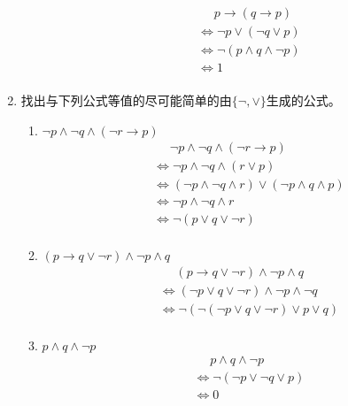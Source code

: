 \documentclass[UTF8]{ctexart}
\begin{document}
\begin{enumerate}
\begin{enumerate}
\[\begin{aligned}
                &\mathrel{\phantom{=}} p\rightarrow(q\rightarrow p)\\
                &\Leftrightarrow \neg p \vee (\neg q \vee p)\\
                &\Leftrightarrow \neg (p \wedge q \wedge \neg p)\\
                &\Leftrightarrow 1\\
            \end{aligned}    
        \]
    \end{enumerate}
    \item 找出与下列公式等值的尽可能简单的由$\{\neg , \vee\}$生成的公式。
    \begin{enumerate}
        \item  $\neg p \wedge  \neg q \wedge  (\neg r \rightarrow  p)$
        \[
            \begin{aligned}
                &\mathrel{\phantom{=}}\neg p \wedge  \neg q \wedge  (\neg r \rightarrow  p)\\
                &\Leftrightarrow \neg p \wedge \neg q \wedge (r \vee p)\\
                &\Leftrightarrow (\neg p \wedge \neg q \wedge r) \vee (\neg p \wedge q \wedge p)\\
                &\Leftrightarrow \neg p \wedge \neg q \wedge r\\
                &\Leftrightarrow \neg (p \vee q \vee \neg r)\\
            \end{aligned}
        \]
        \item  $( p \rightarrow  q \vee  \neg r) \wedge  \neg p \wedge  q$
        \[
            \begin{aligned}
                &\mathrel{\phantom{=}} ( p \rightarrow  q \vee  \neg r) \wedge  \neg p \wedge  q\\
                &\Leftrightarrow (\neg p \vee q \vee \neg r)\wedge \neg p \wedge \neg q\\
                &\Leftrightarrow \neg(\neg(\neg p \vee q \vee \neg r)\vee p \vee q)\\
            \end{aligned}  
        \]
        \item  $p \wedge  q \wedge  \neg p$
        \[
            \begin{aligned}
                &\mathrel{\phantom{=}} p \wedge  q \wedge  \neg p\\
                &\Leftrightarrow \neg(\neg p \vee \neg q \vee p)\\
                &\Leftrightarrow 0\\
            \end{aligned}
        \]
        

\end{enumerate}
\end{enumerate}
\end{document}

